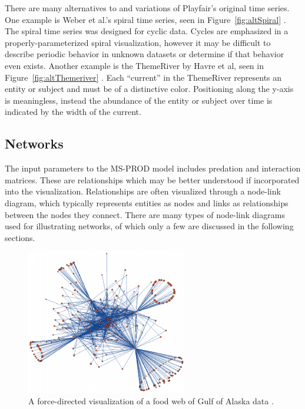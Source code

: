 There are many alternatives to and variations of Playfair's original time series.  One example is Weber et al.'s spiral time series, seen in Figure~\ref{fig:altSpiral} \cite{weber2001}.  The spiral time series was designed for cyclic data.  Cycles are emphasized in a properly-parameterized spiral visualization, however it may be difficult to describe periodic behavior in unknown datasets or determine if that behavior even exists. Another example is the ThemeRiver by Havre et al, seen in Figure~\ref{fig:altThemeriver} \cite{havre2000}.  Each ``current'' in the ThemeRiver represents an entity or subject and must be of a distinctive color.  Positioning along the y-axis is meaningless, instead the abundance of the entity or subject over time is indicated by the width of the current. 

\subsection{Networks}

The input parameters to the MS-PROD model includes predation and interaction matrices.  These are relationships which may be better understood if incorporated into the visualization. Relationships are often visualized through a node-link diagram, which typically represents entities as nodes and links as relationships between the nodes they connect.  There are many types of node-link diagrams used for illustrating networks, of which only a few are discussed in the following sections.

\begin{figure}[h]
	\centering
	\includegraphics[width=7cm]{figures/eps/gaichas.eps}
	\caption{A force-directed visualization of a food web of Gulf of Alaska data \cite{gaichas2008}.}
	\label{fig:gaichas}
\end{figure}


